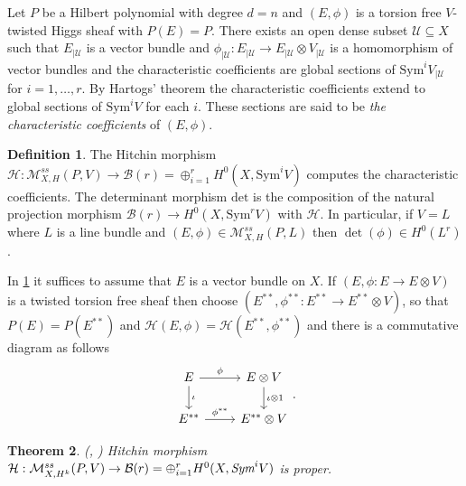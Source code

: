 \documentclass[12pt]{amsart}
\newtheorem{theorem}{Theorem}[subsection]
\theoremstyle{definition}
\newtheorem{definition}[theorem]{Definition}
\theoremstyle{remark}
\numberwithin{equation}{section}
\begin{document}
Let $P$ be a Hilbert polynomial with degree $d = n$ and $(E, \phi)$ is a torsion free $V$-twisted Higgs sheaf with $P(E) = P$. There exists an open dense subset $\mathcal{U}\subseteq X$ such that $E_{|\mathcal{U}}$ is a vector bundle and $\phi_{|\mathcal{U}}:E_{|\mathcal{U}}\to E_{|\mathcal{U}}\otimes V_{|\mathcal{U}}$ is a homomorphism of vector bundles and the characteristic coefficients are global sections of $\mbox{Sym}^iV_{|\mathcal{U}}$ for $i = 1,\dots, r$. By Hartogs' theorem the characteristic coefficients extend to global sections of $\mbox{Sym}^iV$ for each $i$. These sections are said to be \textit{the characteristic coefficients} of $(E, \phi)$. 
\begin{definition}\label{hitchmo}
The Hitchin morphism $\mathcal{H}:\mathcal{M}_{X, H}^{ss}(P, V)\to \mathcal{B}(r)=\oplus_{i=1}^r H^0(X, \mbox{Sym}^iV)$ computes the characteristic coefficients. The determinant morphism $\mbox{det}$ is the composition of the natural projection morphism $\mathcal{B}(r)\to H^0(X, \mbox{Sym}^rV)$ with $\mathcal{H}$. In particular, if $V = L$ where $L$ is a line bundle and $(E, \phi)\in\mathcal{M}_{X, H}^{ss}(P, L)$ then $\det(\phi)\in H^0(L^r)$.
\end{definition}

In \ref{hitchmo} it suffices to assume that $E$ is a vector bundle on $X$. If $(E, \phi:E\to E\otimes V)$ is a twisted torsion free sheaf then choose $(E^{**}, \phi^{**}: E^{**}\to E^{**}\otimes V)$, so that $P(E) = P(E^{**})$ and $\mathcal{H}(E, \phi) = \mathcal{H}(E^{**}, \phi^{**})$ and there is a commutative diagram as follows
\begin{equation}
\begin{tikzcd}
E \arrow[r, "\phi"] \arrow[d, "\iota"]
& E\otimes V \arrow[d, "\iota \otimes 1"] \\
E^{**} \arrow[r, "\phi^{**}"]
& E^{**}\otimes V
\end{tikzcd}.
\end{equation}

\begin{theorem}
(\cite{gallego2023higgs}, \cite{Simp2}) Hitchin morphism $\mathcal{H}: \mathcal{M}_{X, H^k}^{ss}(P, V)\to \mathcal{B}(r)=\oplus_{i=1}^r H^0(X, \emph{Sym}^iV)$ is proper. 
\end{theorem}






 
\end{document}
